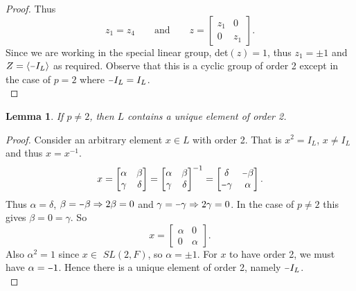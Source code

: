 \documentclass[a4paper , 11pt]{book}
\newcommand{\minus}{\scalebox{0.75}[1.0]{$-$}}
\newtheorem{lemma}[theorem]{Lemma}
\theoremstyle{definition}
\theoremstyle{remark}
\begin{document}
\begin{proof}
\noindent Thus \begin{equation*} z_1 = z_4 \qquad  \text{and} \qquad z =  \begin{bmatrix} z_1 & 0 \\ 0 & z_1 \end{bmatrix}. \end{equation*}
\noindent Since we are working in the special linear group, det$(z)=1$, thus $z_1 = \pm 1$ and $Z = \langle \minus I_L \rangle$ as required. Observe that this is a cyclic group of order 2 except in the case of $p=2$ where $\minus I_L = I_L$. \\
\end{proof}

\begin{lemma} \label{6.2b} If $p\neq 2$, then $L$ contains a unique element of order 2. \\
\end{lemma}

\begin{proof} Consider an arbitrary element $x \in L$ with order 2. That is $x^2 = I_L$, $x \neq I_L$ and thus $x=x^{-1}$.
\begin{equation*} x = \begin{bmatrix} \alpha & \beta \\ \gamma & \delta \end{bmatrix} = \begin{bmatrix} \alpha & \beta \\ \gamma & \delta \end{bmatrix}^{-1} = \begin{bmatrix} \delta & \minus \beta \\ \minus \gamma & \alpha \end{bmatrix}.
\end{equation*}
\noindent Thus $\alpha = \delta$, $\beta = \minus \beta \Rightarrow 2\beta = 0$ and $\gamma = \minus \gamma \Rightarrow 2\gamma = 0$. In the case of $p \neq 2$ this gives $\beta = 0 = \gamma$. So
\begin{equation*} x = \begin{bmatrix} \alpha & 0 \\ 0 & \alpha \end{bmatrix}.
\end{equation*}
\noindent Also $\alpha ^2 = 1$ since $x \in$ $SL(2,F)$, so $\alpha = \pm 1$. For $x$ to have order 2, we must have $\alpha = \minus 1$. Hence there is a unique element of order 2, namely $\minus I_L$.
\\
\end{proof}
\end{document}
